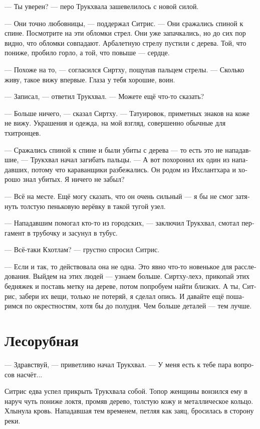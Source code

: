 \documentclass[a4paper,12pt,fleqn]{book}\usepackage{cooltooltips}\usepackage{polyglossia}\setdefaultlanguage{russian}\setotherlanguage{english}\defaultfontfeatures{Ligatures=TeX,Mapping=tex-text} \usepackage{xcolor}\definecolor{lightgray}{HTML}{bbbbbb}\color{lightgray}\newcommand{\ml}[3]{\textenglish{\textcolor{black}{#3}}}
\begin{document}
--- Ты уверен? --- перо Трукхвала зашевелилось с новой силой.

--- Они точно любовницы, --- поддержал Ситрис.
--- Они сражались спиной к спине.
Посмотрите на эти обломки стрел.
Они уже запачкались, но до сих пор видно, что обломки совпадают.
Арбалетную стрелу пустили с дерева.
Той, что пониже, пробило горло, а той, что повыше --- сердце.

--- Похоже на то, --- согласился Сиртху, пощупав пальцем стрелы.
--- Сколько живу, такое вижу впервые.
Глаза у тебя хорошие, воин.

--- Записал, --- ответил Трукхвал.
--- Можете ещё что-то сказать?

--- Больше ничего, --- сказал Сиртху.
--- Татуировок, приметных знаков на коже не вижу.
Украшения и одежда, на мой взгляд, совершенно обычные для тхитронцев.

--- Сражались спиной к спине и были убиты с дерева --- то есть это не нападавшие, --- Трукхвал начал загибать пальцы.
--- А вот похоронил их один из нападавших, потому что караванщики разбежались.
Он родом из Ихслантхара и хорошо знал убитых.
Я ничего не забыл?

--- Всё на месте.
Ещё могу сказать, что он очень сильный --- я бы не смог затянуть толстую пеньковую верёвку в такой тугой узел.

--- Нападавшим помогал кто-то из городских, --- заключил Трукхвал, смотал пергамент в трубочку и засунул в тубус.

--- Всё-таки Кхотлам? --- грустно спросил Ситрис.

--- Если и так, то действовала она не одна.
Это явно что-то новенькое для расследования.
Выйдем на этих людей --- узнаем больше.
Сиртху-лехэ, прикопай этих бедняжек и поставь метку на дереве, потом попробуем найти близких.
А ты, Ситрис, забери их вещи, только не потеряй, я сделал опись.
И давайте ещё пошаримся по окрестностям, хотя бы до полудня.
Чем больше деталей --- тем лучше.

\section{Лесорубная}

--- Здравствуй, --- приветливо начал Трукхвал.
--- У меня есть к тебе пара вопросов насчёт...

Ситрис едва успел прикрыть Трукхвала собой.
Топор женщины вонзился ему в наруч чуть пониже локтя, промяв дерево, толстую кожу и металлическое кольцо.
Хлынула кровь.
Нападавшая тем временем, петляя как заяц, бросилась в сторону реки.
\end{document}
